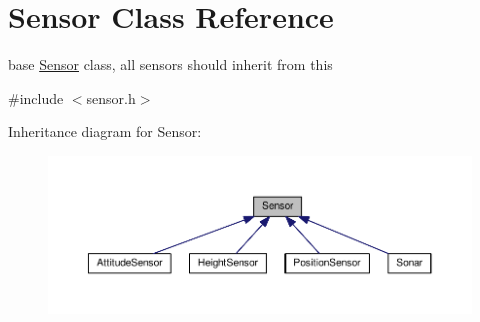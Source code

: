 \hypertarget{classSensor}{}\section{Sensor Class Reference}
\label{classSensor}


base \hyperlink{classSensor}{Sensor} class, all sensors should inherit from this  




{\ttfamily \#include $<$sensor.\+h$>$}



Inheritance diagram for Sensor\+:\nopagebreak
\begin{figure}[H]
\begin{center}
\leavevmode
\includegraphics[width=350pt]{classSensor__inherit__graph}
\end{center}
\end{figure}
